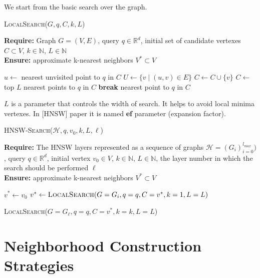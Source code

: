 \documentclass{article}
\begin{document}
We start from the basic search over the graph. 

\begin{algorithm}
\caption{\textsc{LocalSearch}($G, q, C, k, L$)}\label{alg:local_search}
\textbf{Require:} Graph $G = (V, E)$, query $q \in \mathbb{R}^d$, initial set of candidate vertexes $C \subset V$,  $k \in \mathbb{N}$, $L \in \mathbb{N}$ \\
\textbf{Ensure:} approximate k-nearest neighbors $V^* \subset V$
\begin{algorithmic}[1]
    \State $u \gets$ nearest unvisited point to $q$ in $C$
    \State $U \gets \{v \mid (u, v) \in E\}$
            \State $C \gets C \cup \{v\}$
        \EndIf
    \EndFor
        \State $C \gets$ top $L$ nearest points to $q$ in $C$
    \EndIf
        \State \textbf{break}
    \EndIf
\EndWhile
\State \Return nearest point to $q$ in $C$
\end{algorithmic}
\end{algorithm}

$L$ is a parameter that controls the width of search. 
It helps to avoid local minima vertexes. In [HNSW] paper it is named \textbf{ef} parameter (expansion factor). 



\begin{algorithm}
\caption{\textsc{HNSW-Search}($\mathcal{H}, q, v_0, k, L, \ell $)}\label{alg:hnsw_search}
\textbf{Require:} The HNSW layers represented as  a sequence of graphs $\mathcal{H} = (G_i)_{i=0}^{l_{max}} )$, query $q \in \mathbb{R}^d$, initial vertex $v_0 \in V$,  $k \in \mathbb{N}$, $L \in \mathbb{N}$, the layer number in which the search should be performed $\ell$ \\    
\textbf{Ensure:} approximate k-nearest neighbors $V^* \subset V$
\begin{algorithmic}[1]

\State $v^* \gets v_0$ 
    \State $v^* \gets \textsc{LocalSearch}(G=G_i, q=q, C={v^*}, k=1, L=L)$
\EndFor

\State \Return \textsc{LocalSearch}($ G=G_{\ell}, q=q, C={v^*}, k=k, L=L$)
\end{algorithmic}
\end{algorithm}

\section {Neighborhood Construction Strategies}
\end{document}
